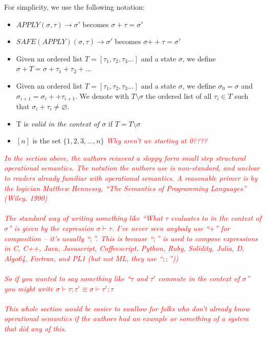 \documentclass[11pt,a4paper]{report}
\newcommand{\comment}[1]{\textcolor{red}{\textit{#1}}}
\theoremstyle{plain}
\theoremstyle{definition}
\theoremstyle{remark}
\begin{document}
For simplicity, we use the following notation:

\begin{itemize}
\item
$APPLY(\sigma, \tau) \rightarrow \sigma'$ becomes $\sigma + \tau = \sigma'$
\item
$SAFE(APPLY)(\sigma, \tau) \rightarrow \sigma'$ becomes $\sigma {++} \tau = \sigma'$
\item  
Given an ordered list $T = [\tau_1, \tau_2, \tau_3...]$ and a state $\sigma$, we define $\sigma + T = \sigma + \tau_1 + \tau_2 + ...$
\item
Given an ordered list $T = [\tau_1, \tau_2, \tau_3...]$ and a state $\sigma$, we define $\sigma_0 = \sigma$ and $\sigma_{i+1} = \sigma_i ++ \tau_{i+1}$. We denote with $T \setminus \sigma$ the ordered list of all $\tau_i \in T$ such that $\sigma_i + \tau_i \ne \varnothing$.
\item
T is \emph{valid in the context of $\sigma$} if $T = T \setminus \sigma$
\item
$[n]$ is the set $\{1, 2, 3, \ldots, n\}$ \comment{Why aren't we starting at 0????}
\end{itemize}

\comment{In the section above, the authors reinvent a sloppy form small step structural operational semantics.  The notation the authors use is non-standard, and unclear to readers already familiar with operational semantics.  A reasonable primer is by the logician Matthew Hennessy, ``The Semantics of Programming Languages'' (Wiley, 1990)\\
\\
The standard way of writing something like ``What $\tau$ evaluates to in the context of $\sigma$'' is given by the expression $\sigma \vdash \tau$.  I've never seen anybody use ``$+$'' for composition -- it's usually ``$;$''.  This is because ``$;$'' is used to compose expressions in C, C++, Java, Javascript, Coffeescript, Python, Ruby, Solidity, Julia, D, Algo64, Fortran, and PL1 (but not ML, they use ``$;;$''))\\
\\
So if you wanted to say something like ``$\tau$ and $\tau'$ commute in the context of $\sigma$'' you might write $\sigma \vdash \tau ; \tau' \equiv \sigma \vdash \tau' ; \tau$\\
\\
This whole section would be easier to swallow for folks who don't already know operational semantics if the authors had an example or something of a system that did any of this.}
\end{document}
